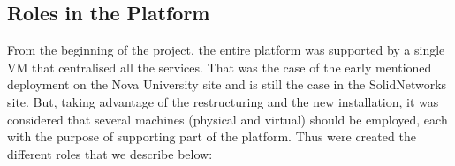 
\subsection{Roles in the Platform}
\label{sub:impl_roles}


From the beginning of the project, the entire platform was supported by a single VM that centralised all the services. That was the case of the early mentioned deployment on the Nova University site and is still the case in the SolidNetworks site. But, taking advantage of the restructuring and the new installation, it was considered that several machines (physical and virtual) should be employed, each with the purpose of supporting part of the platform. Thus were created the different roles that we describe below:

